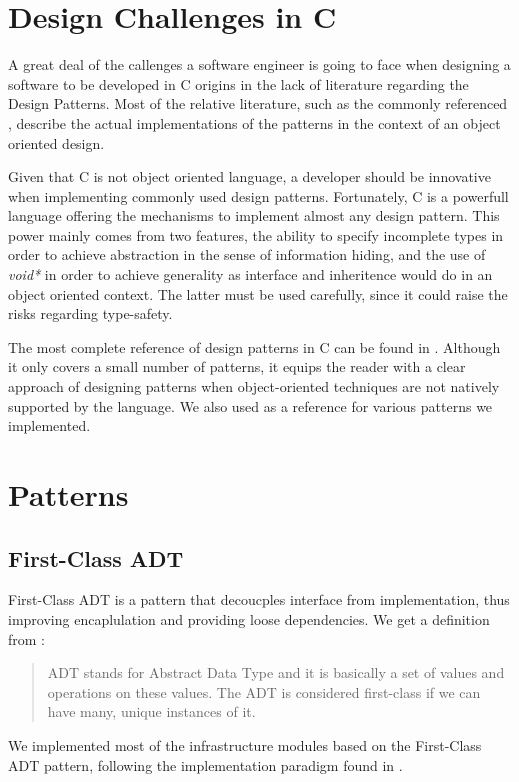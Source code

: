\section{Design Challenges in C}
A great deal of the callenges a software engineer is going to face when designing a software to be developed in C origins in the lack of literature regarding the Design Patterns. Most of the relative literature, such as the commonly referenced \cite{gofdesignpatterns}, describe the actual implementations of the patterns in the context of an object oriented design.

Given that C is not object oriented language, a developer should be innovative when implementing commonly used design patterns. Fortunately, C is a powerfull language offering the mechanisms to implement almost any design pattern. This power mainly comes from two features, the ability to specify incomplete types in order to achieve abstraction in the sense of information hiding, and the use of \textit{void*} in order to achieve generality as interface and inheritence would do in an object oriented context. The latter must be used carefully, since it could raise the risks regarding type-safety.

The most complete reference of design patterns in C can be found in \cite{patternsinc}. Although it only covers a small number of patterns, it equips the reader with a clear approach of designing patterns when object-oriented techniques are not natively supported by the language. We also used \cite{patternsinc} as a reference for various patterns we implemented.

\section{Patterns}

\subsection{First-Class ADT}
First-Class ADT is a pattern that decoucples interface from implementation, thus improving encaplulation and providing loose dependencies. We get a definition from \cite{patternsinc}:
\begin{quote}
ADT stands for Abstract Data Type and it is basically a set of values and operations on these values. The ADT is considered first-class if we can have many, unique instances of it.
\end{quote}

We implemented most of the infrastructure modules based on the First-Class ADT pattern, following the implementation paradigm found in \cite{patternsinc}.

